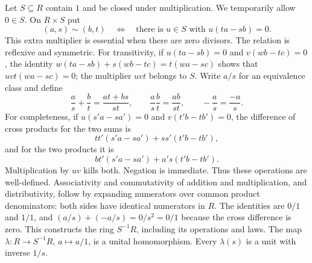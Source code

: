 Let $S\subseteq R$ contain $1$ and be closed under multiplication.
We temporarily allow $0\in S$. On $R\times S$ put
\[
 (a,s)\sim(b,t)\quad\Longleftrightarrow\quad
 \text{there is $u\in S$ with }u(ta-sb)=0.
\]
This extra multiplier is essential when there are zero divisors.
The relation is reflexive and symmetric. For transitivity, if
$u(ta-sb)=0$ and $v(wb-tc)=0$, the identity
$w(ta-sb)+s(wb-tc)=t(wa-sc)$ shows that $uvt(wa-sc)=0$;
the multiplier $uvt$ belongs to $S$.
Write $a/s$ for an equivalence class and define
\[
 \frac as+\frac bt=\frac{at+bs}{st},\qquad
 \frac as\frac bt=\frac{ab}{st},\qquad
 -\frac as=\frac{-a}s.
\]
For completeness, if $u(s'a-sa')=0$ and $v(t'b-tb')=0$, the difference
of cross products for the two sums is
\[
 tt'(s'a-sa')+ss'(t'b-tb'),
\]
and for the two products it is
\[
 bt'(s'a-sa')+a's(t'b-tb').
\]
Multiplication by $uv$ kills both. Negation is immediate.
Thus these operations are well-defined.
Associativity and commutativity of addition and multiplication, and
distributivity, follow by expanding numerators over common product
denominators: both sides have identical numerators in $R$.
The identities are $0/1$ and $1/1$, and
$(a/s)+(-a/s)=0/s^2=0/1$ because the cross difference is zero.
This constructs the ring $S^{-1}R$, including its operations and laws.
The map $\lambda:R\to S^{-1}R$, $a\mapsto a/1$, is a unital homomorphism.
Every $\lambda(s)$ is a unit with inverse $1/s$.

